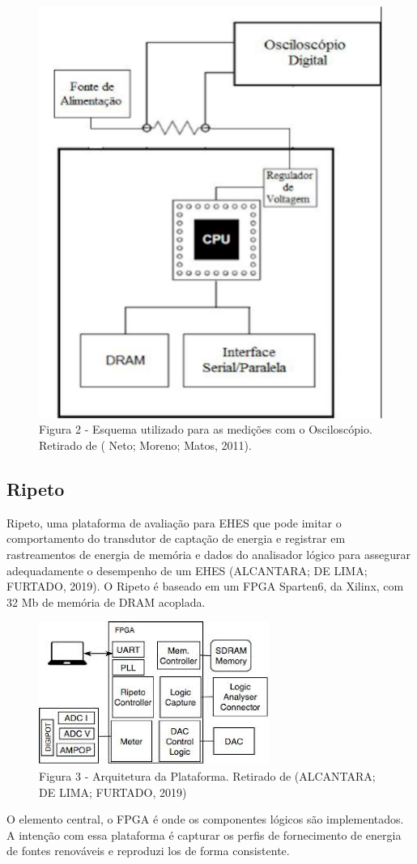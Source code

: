\begin{figure}[!ht]
\centering
\includegraphics[scale=.65]{figures/ociloscopio.png}
\caption{ Figura 2 - Esquema utilizado para as medições com o Osciloscópio. Retirado de  ( Neto; Moreno; Matos, 2011). } \label{Fig:1}
\end{figure}


\subsection{Ripeto}
 Ripeto, uma plataforma de avaliação para EHES que pode imitar o comportamento do transdutor de captação de energia e registrar em rastreamentos de energia de memória e dados do analisador lógico para assegurar adequadamente o desempenho de um EHES (ALCANTARA; DE LIMA; FURTADO, 2019). O Ripeto é baseado em um FPGA Sparten6, da Xilinx, com 32 Mb de memória de DRAM acoplada.

\begin{figure}[!ht]
\centering
\includegraphics[scale=.65]{figures/ripeto.png}
\caption{Figura 3 - Arquitetura da Plataforma. Retirado de (ALCANTARA; DE LIMA; FURTADO, 2019) } \label{Fig:1}
\end{figure}

O elemento central, o FPGA é onde os  componentes lógicos são implementados. A intenção com essa plataforma é capturar os  perfis de fornecimento de energia de fontes renováveis e reproduzi los de forma consistente.